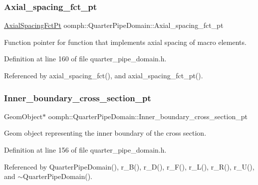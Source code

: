 \subsubsection{\texorpdfstring{Axial\+\_\+spacing\+\_\+fct\+\_\+pt}{Axial\_spacing\_fct\_pt}}
{\footnotesize\ttfamily \hyperlink{classoomph_1_1QuarterPipeDomain_a540d441b38146aacb12938d5f885789c}{Axial\+Spacing\+Fct\+Pt} oomph\+::\+Quarter\+Pipe\+Domain\+::\+Axial\+\_\+spacing\+\_\+fct\+\_\+pt\hspace{0.3cm}{\ttfamily [private]}}



Function pointer for function that implements axial spacing of macro elements. 



Definition at line 160 of file quarter\+\_\+pipe\+\_\+domain.\+h.



Referenced by axial\+\_\+spacing\+\_\+fct(), and axial\+\_\+spacing\+\_\+fct\+\_\+pt().

\mbox{\label{classoomph_1_1QuarterPipeDomain_a2760038e136d58a41dcbcd045bd13ae4}} 
\subsubsection{\texorpdfstring{Inner\+\_\+boundary\+\_\+cross\+\_\+section\+\_\+pt}{Inner\_boundary\_cross\_section\_pt}}
{\footnotesize\ttfamily Geom\+Object$\ast$ oomph\+::\+Quarter\+Pipe\+Domain\+::\+Inner\+\_\+boundary\+\_\+cross\+\_\+section\+\_\+pt\hspace{0.3cm}{\ttfamily [private]}}



Geom object representing the inner boundary of the cross section. 



Definition at line 156 of file quarter\+\_\+pipe\+\_\+domain.\+h.



Referenced by Quarter\+Pipe\+Domain(), r\+\_\+\+B(), r\+\_\+\+D(), r\+\_\+\+F(), r\+\_\+\+L(), r\+\_\+\+R(), r\+\_\+\+U(), and $\sim$\+Quarter\+Pipe\+Domain().

